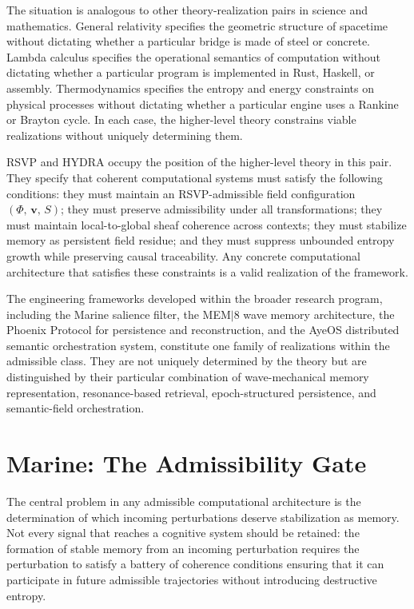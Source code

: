\documentclass[12pt, a4paper, openany]{book}
\theoremstyle{plain}
\theoremstyle{definition}
\theoremstyle{remark}
\newcommand{\vvec}{\mathbf{v}}
\newcommand{\Sfield}{S}
\newcommand{\RSVPtriple}{(\Phi,\,\vvec,\,\Sfield)}
\begin{document}
The situation is analogous to other theory-realization pairs in science and mathematics. General relativity specifies the geometric structure of spacetime without dictating whether a particular bridge is made of steel or concrete. Lambda calculus specifies the operational semantics of computation without dictating whether a particular program is implemented in Rust, Haskell, or assembly. Thermodynamics specifies the entropy and energy constraints on physical processes without dictating whether a particular engine uses a Rankine or Brayton cycle. In each case, the higher-level theory constrains viable realizations without uniquely determining them.

RSVP and HYDRA occupy the position of the higher-level theory in this pair. They specify that coherent computational systems must satisfy the following conditions: they must maintain an RSVP-admissible field configuration $\RSVPtriple$; they must preserve admissibility under all transformations; they must maintain local-to-global sheaf coherence across contexts; they must stabilize memory as persistent field residue; and they must suppress unbounded entropy growth while preserving causal traceability. Any concrete computational architecture that satisfies these constraints is a valid realization of the framework.

The engineering frameworks developed within the broader research program, including the Marine salience filter, the MEM$|$8 wave memory architecture, the Phoenix Protocol for persistence and reconstruction, and the AyeOS distributed semantic orchestration system, constitute one family of realizations within the admissible class. They are not uniquely determined by the theory but are distinguished by their particular combination of wave-mechanical memory representation, resonance-based retrieval, epoch-structured persistence, and semantic-field orchestration.

\section{Marine: The Admissibility Gate}

The central problem in any admissible computational architecture is the determination of which incoming perturbations deserve stabilization as memory. Not every signal that reaches a cognitive system should be retained: the formation of stable memory from an incoming perturbation requires the perturbation to satisfy a battery of coherence conditions ensuring that it can participate in future admissible trajectories without introducing destructive entropy.
\end{document}
